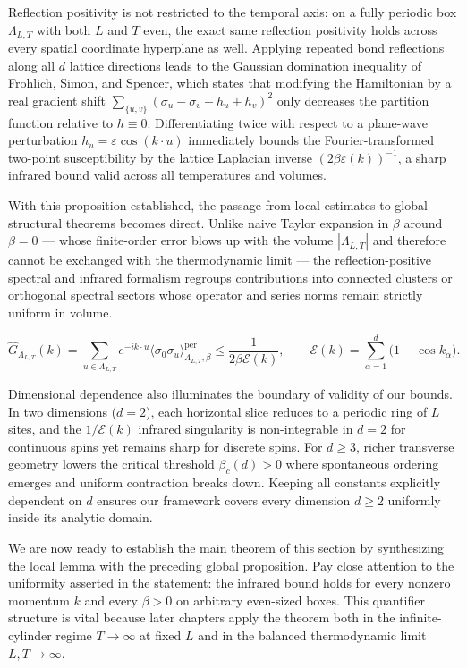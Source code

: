 \documentclass[11pt]{article}
\theoremstyle{definition}
\begin{document}
Reflection positivity is not restricted to the temporal axis: on a fully periodic
box $\Lambda_{L,T}$ with both $L$ and $T$ even, the exact same reflection positivity
holds across every spatial coordinate hyperplane as well. Applying repeated bond
reflections along all $d$ lattice directions leads to the Gaussian domination
inequality of Frohlich, Simon, and Spencer, which states that modifying the
Hamiltonian by a real gradient shift $\sum_{\{u,v\}} (\sigma_u - \sigma_v - h_u +
h_v)^2$ only decreases the partition function relative to $h \equiv 0$.
Differentiating twice with respect to a plane-wave perturbation $h_u = \varepsilon
\cos(k \cdot u)$ immediately bounds the Fourier-transformed two-point susceptibility
by the lattice Laplacian inverse $(2\beta \varepsilon(k))^{-1}$, a sharp infrared
bound valid across all temperatures and volumes.

With this proposition established, the passage from local estimates to global
structural theorems becomes direct. Unlike naive Taylor expansion in $\beta$ around
$\beta = 0$ --- whose finite-order error blows up with the volume $|\Lambda_{L,T}|$
and therefore cannot be exchanged with the thermodynamic limit --- the
reflection-positive spectral and infrared formalism regroups contributions into
connected clusters or orthogonal spectral sectors whose operator and series norms
remain strictly uniform in volume.

\[
  \widehat{G}_{\Lambda_{L,T}}(k) = \sum_{u \in \Lambda_{L,T}} e^{-i k \cdot u} \langle \sigma_0 \sigma_u \rangle_{\Lambda_{L,T},\beta}^{\mathrm{per}} \le \frac{1}{2 \beta \mathcal{E}(k)}, \qquad \mathcal{E}(k) = \sum_{\alpha=1}^d \bigl(1 - \cos k_\alpha\bigr).
\]

Dimensional dependence also illuminates the boundary of validity of our bounds. In
two dimensions ($d = 2$), each horizontal slice reduces to a periodic ring of $L$
sites, and the $1 / \mathcal{E}(k)$ infrared singularity is non-integrable in $d =
2$ for continuous spins yet remains sharp for discrete spins. For $d \ge 3$, richer
transverse geometry lowers the critical threshold $\beta_c(d) > 0$ where spontaneous
ordering emerges and uniform contraction breaks down. Keeping all constants
explicitly dependent on $d$ ensures our framework covers every dimension $d \ge 2$
uniformly inside its analytic domain.

We are now ready to establish the main theorem of this section by synthesizing the
local lemma with the preceding global proposition. Pay close attention to the
uniformity asserted in the statement: the infrared bound holds for every nonzero
momentum $k$ and every $\beta > 0$ on arbitrary even-sized boxes. This quantifier
structure is vital because later chapters apply the theorem both in the
infinite-cylinder regime $T \to \infty$ at fixed $L$ and in the balanced
thermodynamic limit $L, T \to \infty$.
\end{document}
